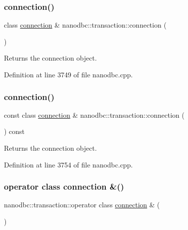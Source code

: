 \subsubsection{\texorpdfstring{connection()}{connection()}\hspace{0.1cm}{\footnotesize\ttfamily [1/2]}}
{\footnotesize\ttfamily class \mbox{\hyperlink{classnanodbc_1_1connection}{connection}} \& nanodbc\+::transaction\+::connection (\begin{DoxyParamCaption}{ }\end{DoxyParamCaption})}



Returns the connection object. 



Definition at line 3749 of file nanodbc.\+cpp.

\mbox{\label{classnanodbc_1_1transaction_aa6233170b92702e6d86cec9aed557a25}} 
\subsubsection{\texorpdfstring{connection()}{connection()}\hspace{0.1cm}{\footnotesize\ttfamily [2/2]}}
{\footnotesize\ttfamily const class \mbox{\hyperlink{classnanodbc_1_1connection}{connection}} \& nanodbc\+::transaction\+::connection (\begin{DoxyParamCaption}{ }\end{DoxyParamCaption}) const}



Returns the connection object. 



Definition at line 3754 of file nanodbc.\+cpp.

\mbox{\label{classnanodbc_1_1transaction_a8492d86e1c09aac1c76c12a0621e8b5a}} 
\subsubsection{\texorpdfstring{operator class connection \&()}{operator class connection \&()}}
{\footnotesize\ttfamily nanodbc\+::transaction\+::operator class \mbox{\hyperlink{classnanodbc_1_1connection}{connection}} \& (\begin{DoxyParamCaption}{ }\end{DoxyParamCaption})}



